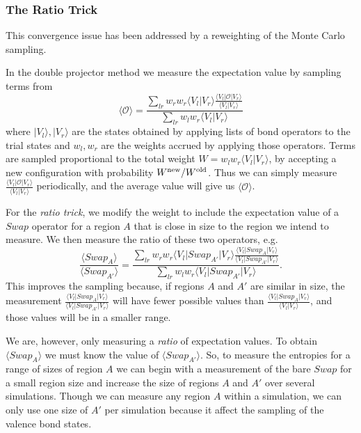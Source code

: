 \documentclass[prb,aps,twocolumn,floatfix,amsmath,amssymb,superscriptaddress,tightenlines]{revtex4}
\newcommand{\be}{\begin{equation}}
\newcommand{\ee}{\end{equation}}
\begin{document}
\subsubsection{The Ratio Trick}
This convergence issue has been addressed by a reweighting of the Monte Carlo sampling.

In the double projector method we measure the expectation value by sampling terms from 
\be
\langle \mathcal{O} \rangle =\frac {\sum_{lr} w_r w_r\langle V_l  \lvert V_r\rangle\frac{  \langle V_l  \lvert \mathcal{O} \lvert V_r\rangle}{ \langle V_l  \lvert V_r\rangle}}
		{\sum_{lr} w_l w_r \langle V_l  \lvert V_r\rangle}
\ee
where $\lvert V_l \rangle, \lvert V_r \rangle$ are the states obtained by applying lists of bond operators to the trial states and $w_l , w_r $ are the weights accrued by applying those operators.
Terms are sampled proportional to the total weight $W = w_l w_r \langle V_l  \lvert V_r\rangle$, by accepting a new configuration with probability $W^{\rm new}/W^{\rm old}$.
Thus we can simply measure $\tfrac{  \langle V_l  \lvert \mathcal{O} \lvert V_r\rangle}{ \langle V_l  \lvert V_r\rangle}$ periodically, and the average value will give us $\langle \mathcal{O} \rangle$.

For the {\it ratio trick}, we modify the weight to include the expectation value of a $Swap$ operator for a region $A$ that is close in size to the region we intend to measure.  
We then measure the ratio of these two operators, e.g.
\be
\frac{\langle {Swap_{A}} \rangle}{\langle {Swap_{A'}} \rangle} =\frac {\sum_{lr} w_r w_r\langle V_l \lvert Swap_{A'} \lvert V_r\rangle\frac{  \langle V_l  \lvert Swap_A \lvert V_r\rangle}{ \langle V_l \lvert Swap_{A'} \lvert V_r\rangle}}
		{\sum_{lr} w_l w_r \langle V_l \lvert Swap_{A'} \lvert V_r\rangle}.
\ee
This improves the sampling because, if regions $A$ and $A'$ are similar in size, the measurement $\tfrac{  \langle V_l  \lvert Swap_A \lvert V_r\rangle}{ \langle V_l \lvert Swap_{A'} \lvert V_r\rangle}$ will have fewer possible values than $\tfrac{  \langle V_l  \lvert Swap_A \lvert V_r\rangle}{ \langle V_l \lvert V_r\rangle}$, and those values will be in a smaller range.

We are, however, only measuring a {\it ratio} of expectation values.
To obtain $ \langle Swap_A \rangle $ we must know the value of $ \langle Swap_{A'} \rangle $.
So, to measure the entropies for a range of sizes of region $A$ we can begin with a measurement of the bare $Swap$ for a small region size and increase the size of regions $A$ and $A'$ over several simulations.
Though we can measure any region $A$ within a simulation, we can only use one size of  $A'$ per simulation because it affect the sampling of the valence bond states.
\end{document}
